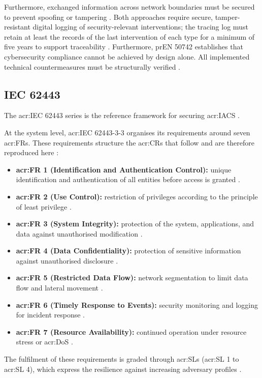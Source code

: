 Furthermore, exchanged information across network boundaries must be secured to prevent spoofing or tampering \cite[p. 50]{prEN50742_2025}. Both approaches require secure, tamper-resistant digital logging of security-relevant interventions; the tracing log must retain at least the records of the last intervention of each type for a minimum of five years to support traceability \cite[p. 19, 23]{prEN50742_2025}. Furthermore, prEN 50742 establishes that cybersecurity compliance cannot be achieved by design alone. All implemented technical countermeasures must be structurally verified \cite[p. 14]{prEN50742_2025}.


\subsection{IEC 62443} 
\label{subsec:iec_62443} 

The \gls{acr:IEC} 62443 series is the reference framework for securing \gls{acr:IACS} \cite[p. 13]{IEC62443-3-3}. 

At the system level, \gls{acr:IEC} 62443-3-3 organises its requirements around seven \glspl{acr:FR}. These requirements structure the \glspl{acr:CR} that follow and are therefore reproduced here \cite[p. 15]{IEC62443-3-3}:
\begin{itemize}
	\item \textbf{\gls{acr:FR} 1 (Identification and Authentication Control):} unique identification and authentication of all entities before access is granted \cite[p. 29]{IEC62443-3-3}.
	\item \textbf{\gls{acr:FR} 2 (Use Control):} restriction of privileges according to the principle of least privilege \cite[p. 41]{IEC62443-3-3}.
	\item \textbf{\gls{acr:FR} 3 (System Integrity):} protection of the system, applications, and data against unauthorised modification \cite[p. 50]{IEC62443-3-3}.
	\item \textbf{\gls{acr:FR} 4 (Data Confidentiality):} protection of sensitive information against unauthorised disclosure \cite[p. 57]{IEC62443-3-3}.
	\item \textbf{\gls{acr:FR} 5 (Restricted Data Flow):} network segmentation to limit data flow and lateral movement \cite[p. 61]{IEC62443-3-3}.
	\item \textbf{\gls{acr:FR} 6 (Timely Response to Events):} security monitoring and logging for incident response \cite[p. 65]{IEC62443-3-3}.
	\item \textbf{\gls{acr:FR} 7 (Resource Availability):} continued operation under resource stress or \gls{acr:DoS} \cite[p. 67]{IEC62443-3-3}.
\end{itemize}
The fulfilment of these requirements is graded through \glspl{acr:SL} (\gls{acr:SL} 1 to \gls{acr:SL} 4), which express the resilience against increasing adversary profiles \cite[p. 16, 26]{IEC62443-3-3}.

